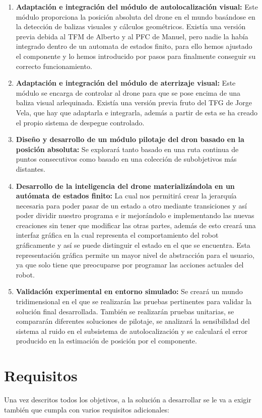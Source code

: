 \begin{enumerate}
	\item{\textbf{Adaptación e integración del módulo de autolocalización visual:} Este módulo proporciona la posición absoluta del drone en el mundo basándose en la detección de balizas visuales y cálculos geométricos. Existía una versión previa debida al TFM de Alberto y al PFC de Manuel, pero nadie la había integrado dentro de un automata de estados finito, para ello hemos ajustado el componente y lo hemos introducido por pasos para finalmente conseguir su correcto funcionamiento.}
	\item{\textbf{Adaptación e integración del módulo de aterrizaje visual:} Este módulo se encarga de controlar al drone para que se pose encima de una baliza visual arlequinada. Existía una versión previa fruto del TFG de Jorge Vela, que hay que adaptarla e integrarla, además a partir de esta se ha creado el propio sistema de despegue controlado.}
	\item{\textbf{Diseño y desarrollo de un módulo pilotaje del dron basado en la posición absoluta:} Se explorará tanto basado en una ruta continua de puntos consecutivos como basado en una colección de subobjetivos más distantes.}
	\item{\textbf{Desarrollo de la inteligencia del drone materializándola en un autómata de estados finito:} La cual nos permitirá crear la jerarquía necesaria para poder pasar de un estado a otro mediante transiciones y así poder dividir nuestro programa e ir mejorándolo e implementando las nuevas creaciones sin tener que modificar las otras partes, además de esto creará una interfaz gráfica en la cual representa el comportamiento del robot gráficamente y así se puede distinguir el estado en el que se encuentra. Esta representación gráfica permite un mayor nivel de abstracción para el usuario, ya que solo tiene que preocuparse por programar las acciones actuales del robot.}
	\item{\textbf{Validación experimental en entorno simulado:} Se creará un mundo tridimensional en el que se realizarán las pruebas pertinentes para validar la solución final desarrollada. También se realizarán pruebas unitarias, se compararán diferentes soluciones de pilotaje, se analizará la sensibilidad del sistema al ruido en el subsistema de autolocalización y se calculará el error producido en la estimación de posición por el componente.}
\end{enumerate}

\section{Requisitos}
\hspace{1cm} Una vez descritos todos los objetivos, a la solución a desarrollar se le va a exigir también que cumpla con varios requisitos adicionales:

